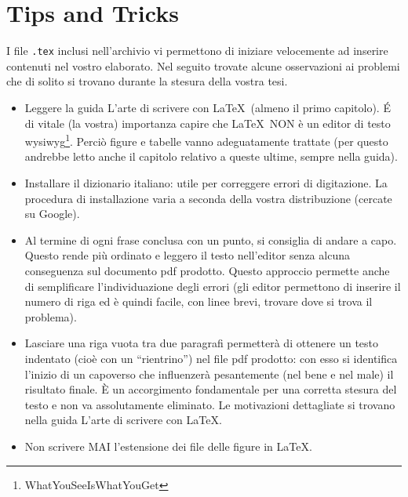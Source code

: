 \documentclass[paper=a4, fontsize=11pt]{scrartcl}	%
\numberwithin{equation}{section}		%
\numberwithin{figure}{section}			%
\numberwithin{table}{section}				%
\begin{document}
\section{Tips and Tricks}
I file \texttt{.tex} inclusi nell'archivio vi permettono di iniziare velocemente ad inserire contenuti nel vostro elaborato. 
Nel seguito trovate alcune osservazioni ai problemi che di solito si trovano durante la stesura della vostra tesi.
\begin{itemize}
\item Leggere la guida L'arte di scrivere con \LaTeX~(almeno il primo capitolo). \'E di vitale (la vostra) importanza capire che \LaTeX~NON \`e un editor di testo wysiwyg\footnote{WhatYouSeeIsWhatYouGet}.  Perci\`o figure e tabelle vanno adeguatamente trattate (per questo andrebbe letto anche il capitolo relativo a queste ultime, sempre nella guida). 
\item Installare il dizionario italiano: utile per correggere errori di digitazione. La procedura di installazione varia a seconda della vostra distribuzione (cercate su Google).
\item Al termine di ogni frase conclusa con un punto, si consiglia di andare a capo. Questo rende pi\`u ordinato e leggero il testo nell'editor senza alcuna conseguenza sul documento pdf prodotto.
Questo approccio permette anche di semplificare l'individuazione degli errori (gli editor permettono di inserire il numero di riga ed \`e quindi facile, con linee brevi, trovare dove si trova il problema). 
\item Lasciare una riga vuota tra due paragrafi permetter\`a di ottenere un testo indentato (cio\`e con un ``rientrino'') nel file pdf prodotto: con esso si identifica l'inizio di un capoverso che influenzer\`a pesantemente (nel bene e nel male) il risultato finale. \`E un accorgimento fondamentale per una corretta stesura del testo e non va assolutamente eliminato. Le motivazioni dettagliate si trovano nella guida L'arte di scrivere con \LaTeX.
\item Non scrivere MAI l'estensione dei file delle figure in \LaTeX. 


\end{itemize}
\end{document}
